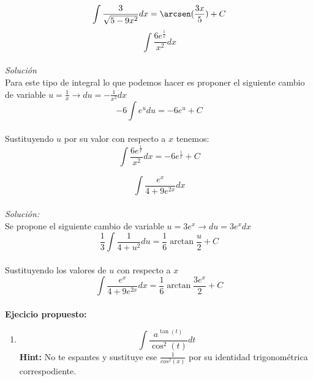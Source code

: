 \documentclass[10pt,executivepaper]{article}
\begin{document}
\[\int \frac{3}{\sqrt{5-9x^{2}}}dx = \arcsen(\frac{3x}{5}) + C\]
\vspace{1.5cm}
\clearpage
\[\int \frac{6 e^{\frac{1}{x}}}{x^{2}}dx\]\\
\textit{Solución}\\
Para este tipo de integral lo que podemos hacer es proponer el siguiente cambio de variable $u = \frac{1}{x} \rightarrow du=-\frac{1}{x^{2}}dx$\\
\[-6\int e^{u}du = -6 e^{u} + C \]\\
Sustituyendo $u$ por su valor con respecto a $x$ tenemos:\\
\[\int \frac{6 e^{\frac{1}{x}}}{x^{2}}dx=-6 e^{\frac{1}{x}} + C\]

\vspace{1cm}
\[\int\frac{e^{x}}{4 + 9 e^{2x}}dx\]
\\
\textit{Solución:}\\
Se propone el siguiente cambio de variable $u=3e^{x}\rightarrow du= 3e^{x}dx$\\
\[\frac{1}{3}\int \frac{1}{4+u^{2}}du=\frac{1}{6}\arctan{\frac{u}{2}}+C\]
\\Sustituyendo los valores de $u$ con respecto a $x$\\
\[\int\frac{e^{x}}{4 + 9 e^{2x}}dx = \frac{1}{6}\arctan{\frac{3e^{x}}{2}}+C\]\\
\textbf{Ejecicio propuesto:}\\
\begin{enumerate}
  \item \[\int \frac{a^{\tan(t)}}{\cos^{2}(t)}dt\]
  \textbf{Hint:} No te espantes y sustituye ese $\frac{1}{cos^{2}(x)}$ por su identidad trigonométrica correspodiente.
\end{enumerate}


\clearpage
\end{document}
